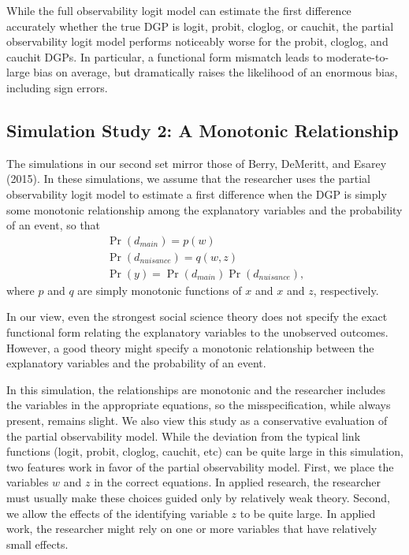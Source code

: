 \documentclass[10pt]{article}
\begin{document}
While the full observability logit model can estimate the first difference accurately whether the true DGP is logit, probit, cloglog, or cauchit, the partial observability logit model performs noticeably worse for the probit, cloglog, and cauchit DGPs. 
In particular, a functional form mismatch leads to moderate-to-large bias on average, but dramatically raises the likelihood of an enormous bias, including sign errors.

\subsection*{Simulation Study 2: A Monotonic Relationship}

The simulations in our second set mirror those of Berry, DeMeritt, and Esarey (2015). 
In these simulations, we assume that the researcher uses the partial observability logit model to estimate a first difference when the DGP is simply some monotonic relationship among the explanatory variables and the probability of an event, so that 
\begin{gather*}
\Pr(d_{main}) = p(w)\nonumber\\
\Pr(d_{nuisance}) = q(w, z) \nonumber\\
\Pr(y) = \Pr(d_{main})\Pr(d_{nuisance})\text{,}\nonumber
\end{gather*}
where $p$ and $q$ are simply monotonic functions of $x$ and $x$ and $z$, respectively.

In our view, even the strongest social science theory does not specify the exact functional form relating the explanatory variables to the unobserved outcomes. 
However, a good theory might specify a monotonic relationship between the explanatory variables and the probability of an event.

In this simulation, the relationships are monotonic and the researcher includes the variables in the appropriate equations, so the misspecification, while always present, remains slight. 
We also view this study as a conservative evaluation of the partial observability model.
While the deviation from the typical link functions (logit, probit, cloglog, cauchit, etc) can be quite large in this simulation, two features work in favor of the partial observability model. 
First, we place the variables $w$ and $z$ in the correct equations. 
In applied research, the researcher must usually make these choices guided only by relatively weak theory.
Second, we allow the effects of the identifying variable $z$ to be quite large.
In applied work, the researcher might rely on one or more variables that have relatively small effects.
 
\end{document}
